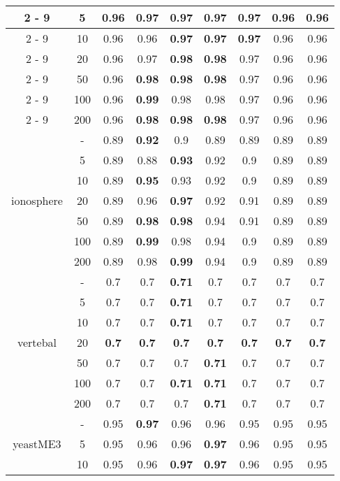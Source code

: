 \documentclass{article}%
\begin{document}
\begin{longtable}{c|c|ccccccc}
\cline{2%
-%
9}%
&5&0.96&\textbf{0.97}&\textbf{0.97}&\textbf{0.97}&\textbf{0.97}&0.96&0.96\\%
\cline{2%
-%
9}%
&10&0.96&0.96&\textbf{0.97}&\textbf{0.97}&\textbf{0.97}&0.96&0.96\\%
\cline{2%
-%
9}%
&20&0.96&0.97&\textbf{0.98}&\textbf{0.98}&0.97&0.96&0.96\\%
\cline{2%
-%
9}%
&50&0.96&\textbf{0.98}&\textbf{0.98}&\textbf{0.98}&0.97&0.96&0.96\\%
\cline{2%
-%
9}%
&100&0.96&\textbf{0.99}&0.98&0.98&0.97&0.96&0.96\\%
\cline{2%
-%
9}%
&200&0.96&\textbf{0.98}&\textbf{0.98}&\textbf{0.98}&0.97&0.96&0.96\\%
\hline%
\multirow{7}{*}{ionosphere}&{-}&0.89&\textbf{0.92}&0.9&0.89&0.89&0.89&0.89\\%
\cline{2%
-%
9}%
&5&0.89&0.88&\textbf{0.93}&0.92&0.9&0.89&0.89\\%
\cline{2%
-%
9}%
&10&0.89&\textbf{0.95}&0.93&0.92&0.9&0.89&0.89\\%
\cline{2%
-%
9}%
&20&0.89&0.96&\textbf{0.97}&0.92&0.91&0.89&0.89\\%
\cline{2%
-%
9}%
&50&0.89&\textbf{0.98}&\textbf{0.98}&0.94&0.91&0.89&0.89\\%
\cline{2%
-%
9}%
&100&0.89&\textbf{0.99}&0.98&0.94&0.9&0.89&0.89\\%
\cline{2%
-%
9}%
&200&0.89&0.98&\textbf{0.99}&0.94&0.9&0.89&0.89\\%
\hline%
\multirow{7}{*}{vertebal}&{-}&0.7&0.7&\textbf{0.71}&0.7&0.7&0.7&0.7\\%
\cline{2%
-%
9}%
&5&0.7&0.7&\textbf{0.71}&0.7&0.7&0.7&0.7\\%
\cline{2%
-%
9}%
&10&0.7&0.7&\textbf{0.71}&0.7&0.7&0.7&0.7\\%
\cline{2%
-%
9}%
&20&\textbf{0.7}&\textbf{0.7}&\textbf{0.7}&\textbf{0.7}&\textbf{0.7}&\textbf{0.7}&\textbf{0.7}\\%
\cline{2%
-%
9}%
&50&0.7&0.7&0.7&\textbf{0.71}&0.7&0.7&0.7\\%
\cline{2%
-%
9}%
&100&0.7&0.7&\textbf{0.71}&\textbf{0.71}&0.7&0.7&0.7\\%
\cline{2%
-%
9}%
&200&0.7&0.7&0.7&\textbf{0.71}&0.7&0.7&0.7\\%
\hline%
\multirow{7}{*}{yeastME3}&{-}&0.95&\textbf{0.97}&0.96&0.96&0.95&0.95&0.95\\%
\cline{2%
-%
9}%
&5&0.95&0.96&0.96&\textbf{0.97}&0.96&0.95&0.95\\%
\cline{2%
-%
9}%
&10&0.95&0.96&\textbf{0.97}&\textbf{0.97}&0.96&0.95&0.95\\%

\end{longtable}
\end{document}
